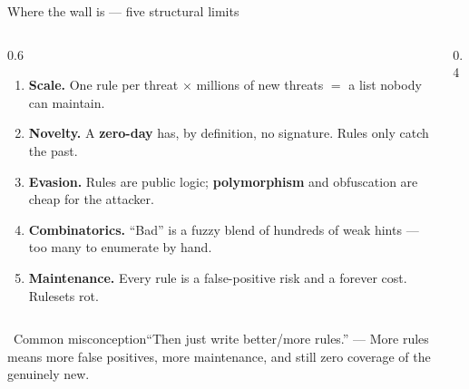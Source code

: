 \documentclass[aspectratio=169,10pt]{beamer}
\newcommand{\term}[1]{{\color{mlink}\textbf{#1}}}         %
\newcommand{\myth}[1]{%
  \begin{alertblock}{\small\ding{55}\ Common misconception}\small #1\end{alertblock}}
\begin{document}
\begin{frame}{Where the wall is --- five structural limits}
  \begin{columns}[T]
    \begin{column}{0.6\textwidth}
      \begin{enumerate}\setlength\itemsep{3pt}
        \item \term{Scale.} One rule per threat $\times$ millions of new threats
              $=$ a list nobody can maintain.
        \item \term{Novelty.} A \term{zero-day} has, by definition, no signature.
              Rules only catch the past.
        \item \term{Evasion.} Rules are public logic; \term{polymorphism} and
              obfuscation are cheap for the attacker.
        \item \term{Combinatorics.} ``Bad'' is a fuzzy blend of hundreds of weak
              hints --- too many to enumerate by hand.
        \item \term{Maintenance.} Every rule is a false-positive risk and a
              forever cost. Rulesets rot.
      \end{enumerate}
    \end{column}
    \begin{column}{0.4\textwidth}
      \centering
    \end{column}
  \end{columns}
  \myth{``Then just write better/more rules.'' --- More rules means more false
  positives, more maintenance, and still zero coverage of the genuinely new.}
\end{frame}

\end{document}
